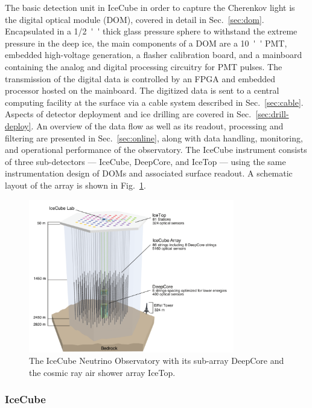 The basic detection unit in IceCube in order to capture the Cherenkov light is the
digital optical module (DOM), covered in detail in Sec.~\ref{sec:dom}.
Encapsulated in a \SI{1/2}{''} thick glass pressure sphere 
to withstand the extreme pressure in the deep ice, the main components of a DOM
are a \SI{10}{''} PMT, embedded high-voltage generation, a flasher calibration
board, and a mainboard containing the analog and digital processing circuitry
for PMT pulses.  The transmission of the digital data is controlled by an FPGA
and embedded processor hosted on the mainboard. The digitized data is sent to a
central computing facility at the surface via a cable system described in
Sec.~\ref{sec:cable}.  Aspects of detector deployment and ice drilling are
covered in Sec.~\ref{sec:drill-deploy}. An overview of the data flow as well as
its readout, processing and filtering are presented in
Sec.~\ref{sec:online}, along with data handling, monitoring, and operational performance of
the observatory. The IceCube instrument consists of three sub-detectors ---
IceCube, DeepCore, and IceTop --- using the same instrumentation design of
DOMs and associated surface readout. A schematic layout of the array is
shown in Fig.~\ref{fig:array}. 

\begin{figure}[!h]
 \centering
 \includegraphics[width=0.8\textwidth]{graphics/intro/ArrayWSeasonsLabels_crop.pdf}
 \caption{The IceCube Neutrino Observatory with its sub-array DeepCore and
   the cosmic ray air shower array IceTop.}
 \label{fig:array}
\end{figure}

\subsubsection{IceCube}


